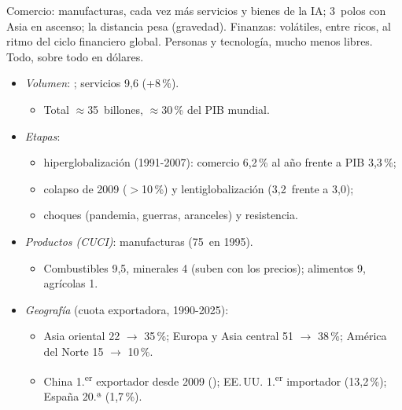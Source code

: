 \documentclass{article}
\begin{document}
\begin{columnas}
\begin{ideaclave}
Comercio: manufacturas, cada vez más servicios y bienes de la IA; 3~polos con Asia en ascenso; la distancia pesa (gravedad). Finanzas: volátiles, entre ricos, al ritmo del ciclo financiero global. Personas y tecnología, mucho menos libres. Todo, sobre todo en dólares.
\end{ideaclave}

\begin{itemize}
\item \emph{Volumen}: ; servicios 9,6 (+8\,\%).
  \begin{itemize}
  \item Total $\approx$35~billones, $\approx$30\,\% del PIB mundial.
  \end{itemize}
\item \emph{Etapas}:
  \begin{itemize}
  \item hiperglobalización (1991-2007): comercio 6,2\,\% al año frente a PIB 3,3\,\%;
  \item colapso de 2009 ($>$10\,\%) y lentiglobalización (3,2~frente a 3,0);
  \item choques (pandemia, guerras, aranceles) y resistencia.
  \end{itemize}
\item \emph{Productos (CUCI)}: manufacturas  (75~en 1995).
  \begin{itemize}
  \item Combustibles 9,5, minerales 4 (suben con los precios); alimentos 9, agrícolas 1.
  \end{itemize}
\end{itemize}
\begin{itemize}
\item \emph{Geografía} (cuota exportadora, 1990-2025):
  \begin{itemize}
  \item Asia oriental 22 $\to$ 35\,\%; Europa y Asia central 51 $\to$ 38\,\%; América del Norte 15 $\to$ 10\,\%.
  \item China 1.\textsuperscript{er} exportador desde 2009 (); EE.\,UU. 1.\textsuperscript{er} importador (13,2\,\%); España 20.ª (1,7\,\%).

\end{itemize}
\end{itemize}
\end{columnas}
\end{document}
